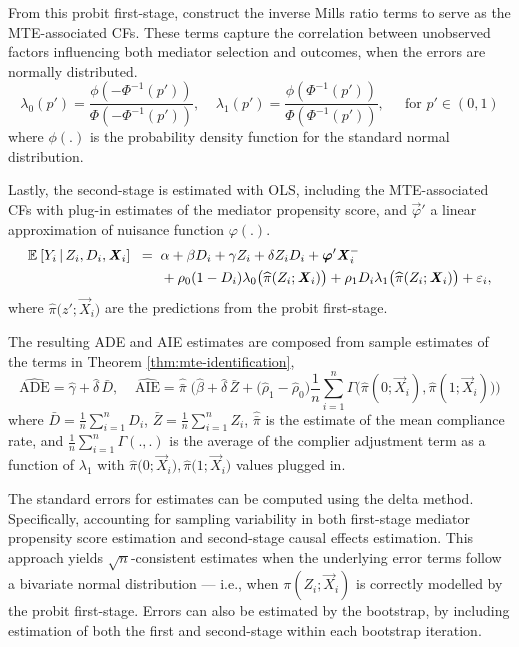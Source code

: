 From this probit first-stage, construct the inverse Mills ratio terms to serve as the MTE-associated CFs.
These terms capture the correlation between unobserved factors influencing both mediator selection and outcomes, when the errors are normally distributed.
\[ \lambda_0(p') =
        \frac{\phi( - \Phi^{-1}(p') )}{\Phi( -\Phi^{-1}(p') )}, \;\;\;\;
    \lambda_1(p') =
        \frac{\phi( \Phi^{-1}(p') )}{\Phi( \Phi^{-1}(p') )},
        \;\;\;\; \text{ for } p' \in (0,1) \]
where $\phi(.)$ is the probability density function for the standard normal distribution.

Lastly, the second-stage is estimated with OLS, including the MTE-associated CFs with plug-in estimates of the mediator propensity score, and $\vec \varphi'$ a linear approximation of nuisance function $\varphi(.)$.
\begin{align*}
    \mathbb{E}_{} \left[ Y_i \, \middle\vert \, Z_i, D_i, \boldsymbol{\mathit{X}}_i \right] \;\; =& \;\;
        \alpha
        + \beta D_i
        + \gamma Z_i
        + \delta Z_i D_i
        + \boldsymbol{\mathit{\varphi}}' \boldsymbol{\mathit{X}}_i^- \\
        & \;\; + \rho_0 (1 - D_i) \lambda_0 \big( \widehat{\pi}(Z_i; \boldsymbol{\mathit{X}}_i) \big)
    + \rho_1 D_i \lambda_1\big( \widehat{\pi}(Z_i; \boldsymbol{\mathit{X}}_i) \big)
    + \varepsilon_i,
\end{align*}
where $\hat\pi \big(z';\vec X_i \big)$ are the predictions from the probit first-stage.

The resulting ADE and AIE estimates are composed from sample estimates of the terms in Theorem \ref{thm:mte-identification},
\[ \hat{\text{ADE}}
    = \hat{\gamma} + \hat{\delta}\,\bar D, \;\;\;\;
    \hat{\text{AIE}}
    = \hat{\bar\pi}\; \Big(
        \hat{\beta} + \hat{\delta}\,\bar Z
        + \big(\hat \rho_1 - \hat \rho_0 \big)
        \frac1n \sum_{i=1}^n \Gamma \big( \hat\pi(0;\vec X_i), \hat\pi(1;\vec X_i)\big) \Big) \]
where $\bar D = \frac1n \sum_{i=1}^n D_i$, $\bar Z = \frac1n \sum_{i=1}^n Z_i$,
$\hat{\bar\pi}$ is the estimate of the mean compliance rate, and $\frac1n \sum_{i=1}^n \Gamma(.,.)$ is the average of the complier adjustment term as a function of $\lambda_1$ with $\hat\pi \big(0; \vec X_i \big), \hat\pi \big(1; \vec X_i \big)$ values plugged in.

The standard errors for estimates can be computed using the delta method.
Specifically, accounting for sampling variability in both first-stage mediator propensity score estimation and second-stage causal effects estimation.
This approach yields $\sqrt{n}$-consistent estimates when the underlying error terms follow a bivariate normal distribution --- i.e., when $\pi(Z_i; \vec X_i)$ is correctly modelled by the probit first-stage.
Errors can also be estimated by the bootstrap, by including estimation of both the first and second-stage within each bootstrap iteration.

